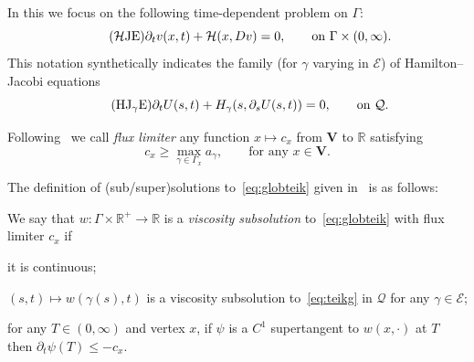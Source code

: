 \documentclass[11pt,a4paper,american]{article}
\newcommand{\Ecal}{\mathcal E}
\newcommand{\Hcal}{\mathcal H}
\newcommand{\Qcal}{\mathcal Q}
\newcommand{\Rds}{\mathds R}
\newcommand{\Vbf}{\mathbf V}
\begin{document}
    In this  we focus on the following time-dependent problem on $\Gamma$:
    \begin{equation}\label{eq:globteik}\tag{\ensuremath{\Hcal}JE}
        \partial_t v(x,t)+\Hcal(x,Dv)=0,\qquad\text{on }\Gamma\times(0,\infty).
    \end{equation}
    This notation synthetically indicates the family (for $\gamma$ varying in $\Ecal$) of Hamilton--Jacobi equations
    \begin{equation}\label{eq:teikg}\tag{HJ\textsubscript{\ensuremath{\gamma}}E}
        \partial_t U(s,t)+H_\gamma(s,\partial_s U(s,t))=0,\qquad\text{on }\Qcal.
    \end{equation}

    Following~\cite{ImbertMonneau17} we call \emph{flux limiter} any function $x\mapsto c_x$ from $\Vbf$ to $\Rds$ satisfying
    \begin{equation*}
        c_x\ge\max_{\gamma\in\Gamma_x}a_\gamma,\qquad\text{for any }x\in\Vbf.
    \end{equation*}

    The definition of (sub/super)solutions to~\cref{eq:globteik} given in~\cite{PozzaSiconolfi23,Siconolfi22} is as follows:

    \begin{defin}\label{deftsubsol}
        We say that $w:\Gamma\times\Rds^+\to\Rds$ is a \emph{viscosity subsolution} to~\cref{eq:globteik} with flux limiter $c_x$ if
        \begin{myenum}
            \item it is continuous;
            \item\label{loctsubsol} $(s,t)\mapsto w(\gamma(s),t)$ is a viscosity subsolution to~\cref{eq:teikg} in $\Qcal$ for any $\gamma\in\Ecal$;
            \item\label{fluxcond} for any $T\in(0,\infty)$ and vertex $x$, if $\psi$ is a $C^1$ supertangent to $w(x,\cdot)$ at $T$ then $\partial_t\psi(T)\le-c_x$.
        \end{myenum}
    \end{defin}
\end{document}

